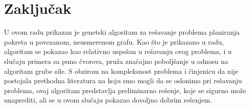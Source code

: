 \documentclass[12pt]{article}
\begin{document}
	\section{Zaključak}
	\label{sec:zakljucak}
	
	U ovom radu prikazan je genetski algoritam za rešavanje problema planiranja pokreta u povezanom, neusmerenom grafu. Kao što je prikazano u radu, algoritam se pokazao kao relativno uspešan u rešavanju ovog problema, i u slučaju primera sa puno čvorova, pruža značajno poboljšanje u odnosu na algoritam grube sile. S obzirom na kompleksnost problema i činjenicu da nije postojala prethodna literatura na koju smo mogli da se oslonimo pri rešavanju problema, ovaj algoritam predstavlja preliminarno rešenje, koje se sigurno može unaprediti, ali se u ovom slučaju pokazao dovoljno dobrim rešenjem.
	
	\newpage
	
	 
	
	
\end{document}
